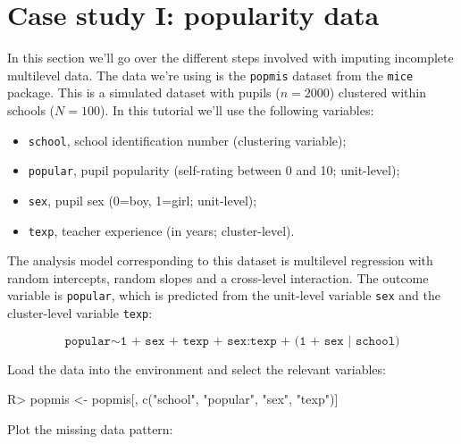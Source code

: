 \documentclass[
]{jss}
\providecommand{\tightlist}{%
  \setlength{\itemsep}{0pt}\setlength{\parskip}{0pt}}
\begin{document}
\hypertarget{case-study-i-popularity-data}{%
\section{Case study I: popularity
data}\label{case-study-i-popularity-data}}

In this section we'll go over the different steps involved with imputing
incomplete multilevel data. The data we're using is the \texttt{popmis}
dataset from the \texttt{mice} package. This is a simulated dataset with
pupils (\(n = 2000\)) clustered within schools (\(N = 100\)). In this
tutorial we'll use the following variables:

\begin{itemize}
\tightlist
\item
  \texttt{school}, school identification number (clustering variable);
\item
  \texttt{popular}, pupil popularity (self-rating between 0 and 10;
  unit-level);
\item
  \texttt{sex}, pupil sex (0=boy, 1=girl; unit-level);
\item
  \texttt{texp}, teacher experience (in years; cluster-level).
\end{itemize}

The analysis model corresponding to this dataset is multilevel
regression with random intercepts, random slopes and a cross-level
interaction. The outcome variable is \texttt{popular}, which is
predicted from the unit-level variable \texttt{sex} and the
cluster-level variable \texttt{texp}:

\[
\texttt{popular} \sim  \texttt{1 + sex + texp + sex:texp + (1 + sex | school)}
\]

Load the data into the environment and select the relevant variables:

\begin{CodeChunk}
\begin{CodeInput}
R> popmis <- popmis[, c("school", "popular", "sex", "texp")] 
\end{CodeInput}
\end{CodeChunk}

Plot the missing data pattern:
\end{document}
